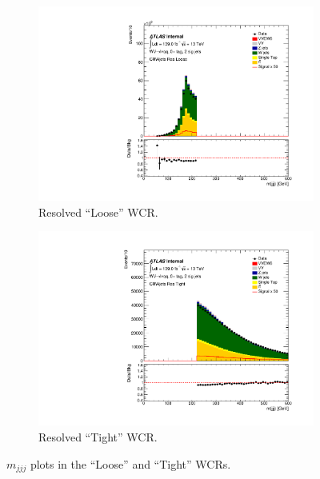 \begin{figure}[ht]
    \centering
    \begin{subfigure}{0.32\textwidth}
        \includegraphics[width=\linewidth]{figures/CRPlots/CRWjets_Res_Loose/stacked_plot_Mjjj.pdf}
        \caption{Resolved ``Loose'' WCR.}
    \end{subfigure}
    \begin{subfigure}{0.32\textwidth}
        \includegraphics[width=\linewidth]{figures/CRPlots/CRWjets_Res_Tight/stacked_plot_Mjjj.pdf}
	\caption{Resolved ``Tight'' WCR.}
    \end{subfigure}
    \caption{$m_{jjj}$ plots in the ``Loose'' and ``Tight'' WCRs.}
    \label{fig:1lepWCR_mjjj}
\end{figure}


